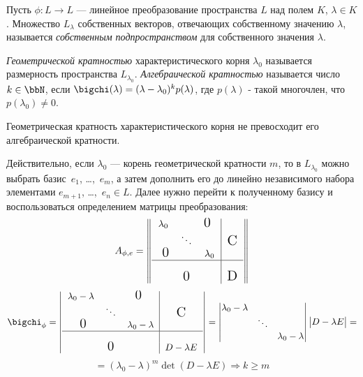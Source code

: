\begin{defn}
Пусть $\phi:L\rightarrow L$ --- линейное преобразование пространства $L$ над полем $K$, $\lambda \in K$. Множество $L_\lambda$ собственных векторов, отвечающих собственному значению $\lambda$, называется \textit{собственным подпространством} для собственного значения $\lambda$.
\end{defn}
\begin{defn}
\textit{Геометрической кратностью} характеристического корня $\lambda_0$ называется размерность пространства $L_{\lambda_0}$.
\textit{Алгебраической кратностью} называется число $k \in \bbN$, если $\bigchi(\lambda)=(\lambda-\lambda_0)^k p(\lambda)$, где $p(\lambda)$ - такой многочлен, что $p(\lambda_0) \neq 0$.
\end{defn}

\begin{thm}
Геометрическая кратность характеристического корня не превосходит его алгебраической кратности.
\end{thm}
Действительно, если $\lambda_0$ --- корень геометрической кратности $m$, то в $L_{\lambda_0}$ можно выбрать базис~$e_1$, \ldots,~$e_m$, а затем дополнить его до линейно независимого набора элементами $e_{m+1}$, \ldots,~$e_n \in L$. Далее нужно перейти к полученному базису и воспользоваться определением матрицы преобразования:
\begin{equation*}
A_{\phi,e}=
\begin{Vmatrix}
\begin{tabular}{ccc|c}
  $\lambda_0$ & 			&$\fudge{0 }$& \\
     			& $\ddots$ 	& 			& $\fudge C$ \\
  $\fudge{ 0}$&			& $\lambda_0$ & \\ \hline
     			&  			& 			& \\
     			& $\fudge 0$ 	& 			& $\fudge D$ \\
\end{tabular} 
\end{Vmatrix} 
\end{equation*}
\begin{equation*}
\bigchi_\phi=
\begin{vmatrix}
\begin{tabular}{ccc|c}
  $\lambda_0-\lambda$ & 			&$\fudge{0 }$ 			& \\
     			& $\ddots$ 	& 			& $\fudge C$ \\
  $\fudge{ 0}$&			& $\lambda_0-\lambda$ & \\ \hline
     			&  			& 			& \\
     			& $\fudge 0$ 	& 			& $ D-\lambda E$ \\
\end{tabular} 
\end{vmatrix} = \begin{vmatrix}
    \lambda_0-\lambda & 			& \\
     			& \ddots 	&  \\
     			&  & \lambda_0-\lambda\\ 
\end{vmatrix} \begin{vmatrix}
D-\lambda E
\end{vmatrix}=
\end{equation*}
\begin{equation}
=(\lambda_0-\lambda)^m \det(D-\lambda E) \Rightarrow k \ge m
\end{equation}
